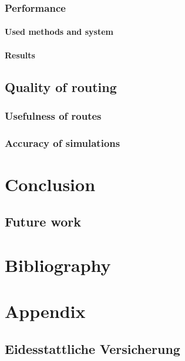 \documentclass[
	11pt,
	a4paper,
	usegeometry,
	twoside,
	openright,
	toc=chapterentrywithdots
]{scrbook}
\begin{document}
			\subsection{Performance}
			
			\subsubsection{Used methods and system}
			
			
			\subsubsection{Results}
		
		\section{Quality of routing}
		
			\subsection{Usefulness of routes}
			
			
			\subsection{Accuracy of simulations}
		
	
	\chapter{Conclusion}
	
		\section{Future work}
		
	\chapter*{Bibliography}
	
	\printbibliography
	
	\chapter*{Appendix}
	
		\clearpage
		\section*{Eidesstattliche Versicherung}
		
\end{document}
